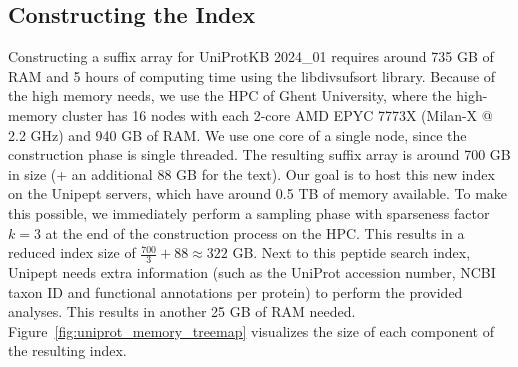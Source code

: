 \documentclass[11pt]{article}
\newenvironment{Figure}
{\par\medskip\noindent\minipage{\linewidth}}
{\endminipage\par\medskip}
\begin{document}
\begin{multicols}{2}
        \subsection{Constructing the Index}
        Constructing a suffix array for UniProtKB 2024\_01 requires around 735 GB of RAM and 5 hours of computing time using the libdivsufsort library.
        Because of the high memory needs, we use the HPC of Ghent University, where the high-memory cluster has 16 nodes with each 2-core AMD EPYC 7773X (Milan-X @ 2.2 GHz) and 940 GB of RAM\@.
        We use one core of a single node, since the construction phase is single threaded.
        The resulting suffix array is around 700 GB in size (+ an additional 88 GB for the text).
        Our goal is to host this new index on the Unipept servers, which have around 0.5 TB of memory available.
        To make this possible, we immediately perform a sampling phase with sparseness factor $k = 3$ at the end of the construction process on the HPC\@.
        This results in a reduced index size of $\frac{700}{3} + 88 \approx 322$ GB\@.
        Next to this peptide search index, Unipept needs extra information (such as the UniProt accession number, NCBI taxon ID and functional annotations per protein) to perform the provided analyses.
        This results in another 25 GB of RAM needed.
        Figure~\ref{fig:uniprot_memory_treemap} visualizes the size of each component of the resulting index.

        \begin{Figure}
            \centering
            \label{fig:uniprot_memory_treemap}
        \end{Figure}


\end{multicols}
\end{document}

